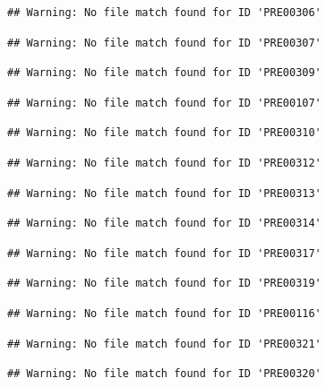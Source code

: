 \documentclass[
]{book}
\theoremstyle{definition}
\theoremstyle{definition}
\theoremstyle{definition}
\theoremstyle{definition}
\theoremstyle{remark}
\begin{document}
\begin{verbatim}
## Warning: No file match found for ID 'PRE00306'
\end{verbatim}

\begin{verbatim}
## Warning: No file match found for ID 'PRE00307'
\end{verbatim}

\begin{verbatim}
## Warning: No file match found for ID 'PRE00309'
\end{verbatim}

\begin{verbatim}
## Warning: No file match found for ID 'PRE00107'
\end{verbatim}

\begin{verbatim}
## Warning: No file match found for ID 'PRE00310'
\end{verbatim}

\begin{verbatim}
## Warning: No file match found for ID 'PRE00312'
\end{verbatim}

\begin{verbatim}
## Warning: No file match found for ID 'PRE00313'
\end{verbatim}

\begin{verbatim}
## Warning: No file match found for ID 'PRE00314'
\end{verbatim}

\begin{verbatim}
## Warning: No file match found for ID 'PRE00317'
\end{verbatim}

\begin{verbatim}
## Warning: No file match found for ID 'PRE00319'
\end{verbatim}

\begin{verbatim}
## Warning: No file match found for ID 'PRE00116'
\end{verbatim}

\begin{verbatim}
## Warning: No file match found for ID 'PRE00321'
\end{verbatim}

\begin{verbatim}
## Warning: No file match found for ID 'PRE00320'
\end{verbatim}
\end{document}

